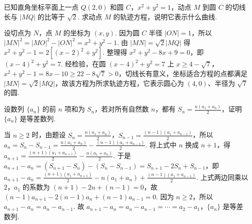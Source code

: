\begin{problem}
已知直角坐标平面上一点 \(Q(2,0)\) 和圆 \(C\)，\(x^{2}+y^{2}=1\)，动点 \(M\) 到圆 \(C\) 的切线长与 \(|MQ|\) 的比等于 \(\sqrt{2}\). 求动点 \(M\) 的轨迹方程，说明它表示什么曲线.
\end{problem}

\begin{solution}
设切点为 \(N\)，点 \(M\) 的坐标为 \((x,y)\). 因为圆 \(C\) 半径 \(|ON|=1\)，所以 \(|MN|^{2}=|MO|^{2}-|ON|^{2}=x^{2}+y^{2}-1\). 由 \(|MN|=\sqrt{2}|MQ|\) 得 \(x^{2}+y^{2}-1=2\left[\left(x-2\right)^{2}+y^{2}\right]\). 整理得 \(x^{2}+y^{2}-8x+9=0\)，即 \(\left(x-4\right)^{2}+y^{2}=7\). 经检验，在圆 \(\left(x-4\right)^{2}+y^{2}=7\) 上 \(x\geqslant 4-\sqrt{7}\)，\(x^{2}+y^{2}-1=8x-10\geqslant 22-8\sqrt{7}>0\)，切线长有意义，坐标适合方程的点都满足 \(|MN|=\sqrt{2}|MQ|\)，故该方程为所求轨迹方程，它表示圆心为 \((4,0)\)、半径为 \(\sqrt{7}\) 的圆.
\end{solution}

\begin{problem}
设数列 \(\{a_{n}\}\) 的前 \(n\) 项和为 \(S_{n}\)，若对所有自然数 \(n\)，都有 \(S_{n}=\frac{n\left(a_{1}+a_{n}\right)}{2}\)，证明 \(\{a_{n}\}\) 是等差数列.
\end{problem}

\begin{solution}
当 \(n\geqslant 2\) 时，由题设 \(S_{n}=\frac{n\left(a_{1}+a_{n}\right)}{2}\)，\(S_{n-1}=\frac{\left(n-1\right)\left(a_{1}+a_{n-1}\right)}{2}\)，所以 \(a_{n}=S_{n}-S_{n-1}=\frac{n\left(a_{1}+a_{n}\right)}{2}-\frac{\left(n-1\right)\left(a_{1}+a_{n-1}\right)}{2}\). 将上式中 \(n\) 换成 \(n+1\)，得 \(a_{n+1}=\frac{\left(n+1\right)\left(a_{1}+a_{n+1}\right)}{2}-\frac{n\left(a_{1}+a_{n}\right)}{2}\). 于是 \(a_{n+1}-a_{n}=\left(S_{n+1}-S_{n}\right)-\left(S_{n}-S_{n-1}\right)=S_{n+1}-2S_{n}+S_{n-1}\)，即 \(a_{n+1}-a_{n}=\frac{\left(n+1\right)\left(a_{1}+a_{n+1}\right)}{2}-n\left(a_{1}+a_{n}\right)+\frac{\left(n-1\right)\left(a_{1}+a_{n-1}\right)}{2}\). 上式两边同乘以 \(2\)，\(a_{1}\) 的系数为 \(\left(n+1\right)-2n+\left(n-1\right)=0\)，故 \(\left(n-1\right)a_{n+1}-2\left(n-1\right)a_{n}+\left(n-1\right)a_{n-1}=0\). 因为 \(n\geqslant 2\)，所以 \(a_{n+1}-a_{n}=a_{n}-a_{n-1}\). 故 \(a_{n+1}-a_{n}=a_{n}-a_{n-1}=\cdots=a_{2}-a_{1}\)，\(\{a_{n}\}\) 是等差数列.
\end{solution}
